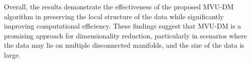         Overall, the results demonstrate the effectiveness of the proposed MVU-DM algorithm in preserving the local structure of the data while significantly improving computational efficiency. These findings suggest that MVU-DM is a promising approach for dimensionality reduction, particularly in scenarios where the data may lie on multiple disconnected manifolds, and the size of the data is large.


    